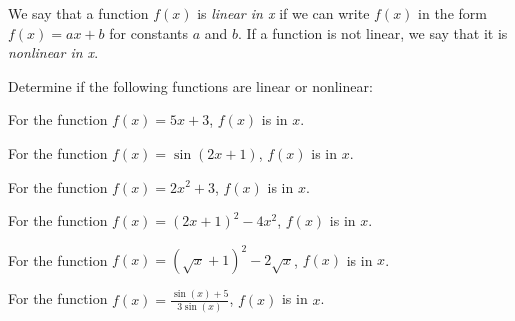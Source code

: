 \documentclass{ximera}
\author{Jim Talamo}
\begin{document}
\begin{exercise}
We say that a function $f(x)$ is \emph{linear in x} if we can write $f(x)$ in the form $f(x) = ax+b$ for constants $a$ and $b$.  If a function is not linear, we say that it is \emph{nonlinear in x}.

Determine if the following functions are linear or nonlinear:

For the function $f(x) = 5x+3$, $f(x)$ is  in $x$.

For the function $f(x) = \sin(2x+1)$, $f(x)$ is  in $x$.

For the function $f(x) = 2x^2+3$, $f(x)$ is  in $x$.

For the function $f(x) = (2x+1)^2-4x^2$, $f(x)$ is  in $x$.

For the function $f(x) = (\sqrt{x}+1)^2-2\sqrt{x}$, $f(x)$ is  in $x$.

For the function $f(x) = \frac{\sin(x)+5}{3\sin(x)}$, $f(x)$ is  in $x$.

\end{exercise}
\end{document}

